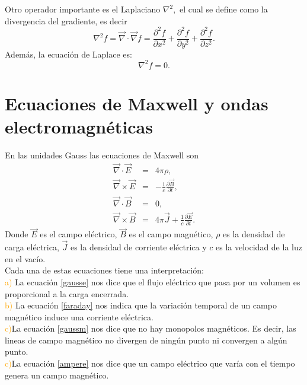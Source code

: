 \documentclass[letterpaper,12pt,oneside]{book}
\begin{document}
Otro operador importante es el Laplaciano $\nabla^2,$ el cual se define como la divergencia del gradiente, es decir 
%
$$\nabla^2f=\vec \nabla \cdot \vec \nabla f = \frac{\partial^2 f}{\partial x^2} + \frac{\partial^2 f}{\partial y^2} + \frac{\partial^2 f}{\partial z^2}.$$ 
%
Adem\'as, la  ecuaci\'on de Laplace es:
%
$$\nabla^2 f = 0.$$
%
\section{Ecuaciones de Maxwell y ondas electromagn\'eticas}


En las unidades Gauss las ecuaciones de Maxwell son \cite{WG}
%
\begin{eqnarray}
\vec \nabla \cdot \vec E &=& 4\pi \rho,  \label{gausse}\\
\vec \nabla \times \vec E &=&-  \frac{1}{c}\frac{\partial \vec B}{\partial t}, \label{faraday}\\
\vec \nabla \cdot \vec  B &=& 0,  \label{gaussm} \\
\vec \nabla \times \vec B &=& 4\pi \vec J+\frac{1}{c}\frac{\partial \vec E}{\partial t}.\label{ampere}
\end{eqnarray}
%
Donde $\vec E$ es el campo el\'ectrico, $\vec B$ es el campo magn\'etico, $\rho$ es la densidad de carga el\'ectrica,  $\vec J$ es la densidad de corriente  el\'ectrica  y $c$ es la velocidad de la luz en el vac\'io.\\

Cada una de estas ecuaciones tiene una interpretaci\'on:\\
 
\textcolor{orange}{a)} La ecuaci\'on \eqref{gausse} nos dice que el flujo el\'ectrico que pasa por  un volumen es proporcional a la carga encerrada.\\

\textcolor{orange}{b)}
La ecuaci\'on \eqref{faraday}  nos indica  que la variaci\'on temporal de un campo magn\'etico induce una corriente el\'ectrica.\\

\textcolor{orange}{c)}La ecuaci\'on \eqref{gaussm} nos dice que no hay  monopolos magn\'eticos. Es decir, las lineas de campo magn\'etico no divergen de ning\'un punto ni convergen a alg\'un punto.\\

\textcolor{orange}{c)}La ecuaci\'on \eqref{ampere} nos dice  que un campo el\'ectrico que var\'ia con el tiempo genera un campo magn\'etico.\\
\end{document}

